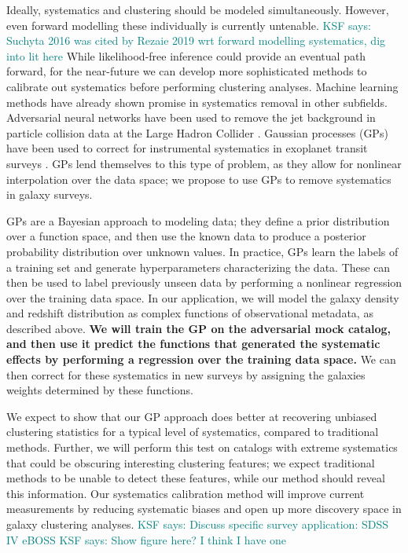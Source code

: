 \documentclass[12pt, fullpage, letterpaper]{article}
\newcommand{\KSF}[1]{\textcolor{teal}{KSF says: #1}}
\begin{document}
Ideally, systematics and clustering should be modeled simultaneously. 
However, even forward modelling these individually is currently untenable. \KSF{Suchyta 2016 was cited by Rezaie 2019 wrt forward modelling systematics, dig into lit here} 
While likelihood-free inference could provide an eventual path forward, for the near-future we can develop more sophisticated methods to calibrate out systematics before performing clustering analyses.
Machine learning methods have already shown promise in systematics removal in other subfields.
Adversarial neural networks have been used to remove the jet background in particle collision data at the Large Hadron Collider \citep{Shimmin2017}.
Gaussian processes (GPs) have been used to correct for instrumental systematics in exoplanet transit surveys \citep{Gibson2012, Aigrain2016}. 
GPs lend themselves to this type of problem, as they allow for nonlinear interpolation over the data space; we propose to use GPs to remove systematics in galaxy surveys.

GPs are a Bayesian approach to modeling data; they define a prior distribution over a function space, and then use the known data to produce a posterior probability distribution over unknown values. 
In practice, GPs learn the labels of a training set and generate hyperparameters characterizing the data.
These can then be used to label previously unseen data by performing a nonlinear regression over the training data space.
In our application, we will model the galaxy density and redshift distribution as complex functions of observational metadata, as described above.
\textbf{We will train the GP on the adversarial mock catalog, and then use it predict the functions that generated the systematic effects by performing a regression over the training data space.}
We can then correct for these systematics in new surveys by assigning the galaxies weights determined by these functions.

We expect to show that our GP approach does better at recovering unbiased clustering statistics for a typical level of systematics, compared to traditional methods.
Further, we will perform this test on catalogs with extreme systematics that could be obscuring interesting clustering features; we expect traditional methods to be unable to detect these features, while our method should reveal this information.
Our systematics calibration method will improve current measurements by reducing systematic biases and open up more discovery space in galaxy clustering analyses.
\KSF{Discuss specific survey application: SDSS IV eBOSS}
\KSF{Show figure here? I think I have one}
\end{document}
